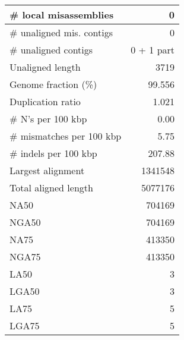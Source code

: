 \documentclass[12pt,a4paper]{article}
\begin{document}
\begin{table}[ht]
\begin{center}
\begin{tabular}{|l*{1}{|r}|}
\# local misassemblies & 0 \\ \hline
\# unaligned mis. contigs & 0 \\ \hline
\# unaligned contigs & 0 + 1 part \\ \hline
Unaligned length & 3719 \\ \hline
Genome fraction (\%) & 99.556 \\ \hline
Duplication ratio & 1.021 \\ \hline
\# N's per 100 kbp & 0.00 \\ \hline
\# mismatches per 100 kbp & 5.75 \\ \hline
\# indels per 100 kbp & 207.88 \\ \hline
Largest alignment & 1341548 \\ \hline
Total aligned length & 5077176 \\ \hline
NA50 & 704169 \\ \hline
NGA50 & 704169 \\ \hline
NA75 & 413350 \\ \hline
NGA75 & 413350 \\ \hline
LA50 & 3 \\ \hline
LGA50 & 3 \\ \hline
LA75 & 5 \\ \hline
LGA75 & 5 \\ \hline
\end{tabular}
\end{center}
\end{table}
\end{document}
